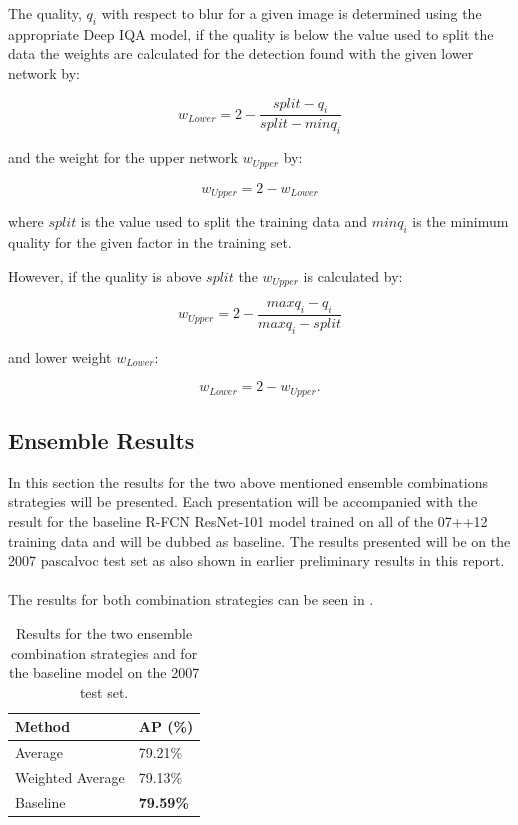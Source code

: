 The quality, $q_i$ with respect to blur for a given image is determined using the appropriate Deep IQA model, if the quality is below the value used to split the data the weights are calculated for the detection found with the given lower network by:

\begin{equation}
	w_{Lower} = 2 - \frac{split - q_i}{split - minq_i}
\end{equation}

and the weight for the upper network $w_{Upper}$ by:

\begin{equation}
	w_{Upper} = 2 - w_{Lower}
\end{equation}

where $split$ is the value used to split the training data and $minq_i$ is the minimum quality for the given factor in the training set.

However, if the quality is above $split$ the $w_{Upper}$ is calculated by:

\begin{equation}
	w_{Upper} = 2 - \frac{maxq_i - q_i}{maxq_i - split}
\end{equation}

and lower weight $w_{Lower}$:

\begin{equation}
	w_{Lower} = 2 - w_{Upper}.
\end{equation}

\subsection{Ensemble Results}
In this section the results for the two above mentioned ensemble combinations strategies will be presented. Each presentation will be accompanied with the result for the baseline R-FCN ResNet-101 model trained on all of the 07++12 training data and will be dubbed as baseline. The results presented will be on the 2007 \gls{pascalvoc} test set as also shown in earlier preliminary results in this report.
\\\\
The results for both combination strategies can be seen in .

\begin{table}[h]
\centering
\caption{Results for the two ensemble combination strategies and for the baseline model on the 2007 test set.}
\label{tab:avgres1}
\begin{tabular}{|l|l|}
\hline
\textbf{Method}           & \textbf{AP (\%)} \\ \hline
Average          & 79.21\% \\ \hline
Weighted Average & 79.13\% \\ \hline
Baseline         & \textbf{79.59\%} \\ \hline
\end{tabular}
\end{table}

